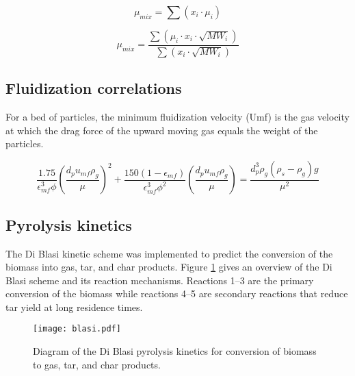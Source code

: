 \begin{equation}\label{eq:graham}
    \mu_{mix} = \sum(x_i \cdot \mu_i)
\end{equation}

\begin{equation}\label{eq:herning}
    \mu_{mix} = \frac{\sum(\mu_i \cdot x_i \cdot \sqrt{MW_i})}{\sum(x_i \cdot \sqrt{MW_i})}
\end{equation}

\subsection{Fluidization correlations}

For a bed of particles, the minimum fluidization velocity (Umf) is the gas velocity at which the drag force of the upward moving gas equals the weight of the particles.

\begin{equation}
    \frac{1.75}{\epsilon_{mf}^3 \phi} \left( \frac{d_p u_{mf} \rho_g}{\mu} \right)^2 + \frac{150(1-\epsilon_{mf})}{\epsilon_{mf}^3 \phi^2} \left( \frac{d_p u_{mf} \rho_g}{\mu} \right) = \frac{d_p^3 \rho_g (\rho_s - \rho_g) g}{\mu^2}
\end{equation}

\subsection{Pyrolysis kinetics}

The Di Blasi kinetic scheme was implemented to predict the conversion of the biomass into gas, tar, and char products. Figure \ref{fig:blasi} gives an overview of the Di Blasi scheme and its reaction mechanisms. Reactions 1--3 are the primary conversion of the biomass while reactions 4--5 are secondary reactions that reduce tar yield at long residence times.

\begin{figure}[H]
    \centering
    \texttt{[image: blasi.pdf]}
    \caption{Diagram of the Di Blasi pyrolysis kinetics for conversion of biomass to gas, tar, and char products.}
    \label{fig:blasi}
\end{figure}

